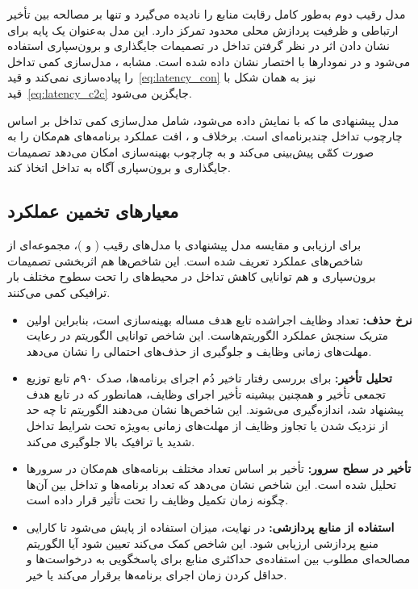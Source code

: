 مدل رقیب دوم به‌طور کامل رقابت منابع را نادیده می‌گیرد و تنها بر مصالحه بین تأخیر ارتباطی و ظرفیت پردازش محلی محدود تمرکز دارد. این مدل به‌عنوان یک پایه برای نشان دادن اثر در نظر گرفتن تداخل در تصمیمات جایگذاری و برون‌سپاری استفاده می‌شود و در نمودارها با اختصار  نشان داده شده است. مشابه ،  مدل‌سازی کمی تداخل را پیاده‌سازی نمی‌کند و قید~\eqref{eq:latency_con} نیز به همان شکل با قید~\eqref{eq:latency_c2c} جایگزین می‌شود.

مدل پیشنهادی ما که با  نمایش داده می‌شود، شامل مدل‌سازی کمی تداخل بر اساس چارچوب تداخل چندبرنامه‌ای است. برخلاف  و ،  افت عملکرد برنامه‌های هم‌مکان را به صورت کمّی پیش‌بینی می‌کند و به چارچوب بهینه‌سازی امکان می‌دهد تصمیمات جایگذاری و برون‌سپاری آگاه به تداخل اتخاذ کند.

\subsection{معیارهای تخمین عملکرد}

برای ارزیابی و مقایسه مدل پیشنهادی  با مدل‌های رقیب ( و )، مجموعه‌ای از شاخص‌های عملکرد تعریف شده است. این شاخص‌ها هم اثربخشی تصمیمات برون‌سپاری و هم توانایی کاهش تداخل در محیط‌های  را تحت سطوح مختلف بار ترافیکی کمی می‌کنند.

\begin{itemize}
\item
\textbf{نرخ حذف:} تعداد وظایف اجراشده تابع هدف مساله بهینه‌سازی است، بنابراین اولین متریک سنجش عملکرد الگوریتم‌هاست. این شاخص‌ توانایی الگوریتم در رعایت مهلت‌های زمانی وظایف و جلوگیری از حذف‌های احتمالی را نشان می‌دهد.
\item
\textbf{تحلیل تأخیر:} برای بررسی رفتار تاخیر دُم اجرای برنامه‌ها، صدک ۹۰م تابع توزیع تجمعی تأخیر و همچنین بیشینه تأخیر اجرای وظایف، همانطور که در تابع هدف پیشنهاد شد، اندازه‌گیری می‌شوند. این شاخص‌ها نشان می‌دهند الگوریتم تا چه حد از نزدیک شدن یا تجاوز وظایف از مهلت‌های زمانی به‌ویژه تحت شرایط تداخل شدید یا ترافیک بالا جلوگیری می‌کند.
\item
\textbf{تأخیر در سطح سرور:} تأخیر بر اساس تعداد مختلف برنامه‌های هم‌مکان در سرورها تحلیل شده است. این شاخص نشان می‌دهد که تعداد برنامه‌ها و تداخل بین آن‌ها چگونه زمان تکمیل وظایف را تحت تأثیر قرار داده است.
\item
\textbf{استفاده از منابع پردازشی:} در نهایت، میزان استفاده از  پایش می‌شود تا کارایی منبع پردازشی ارزیابی شود. این شاخص کمک می‌کند تعیین شود آیا الگوریتم مصالحه‌ای مطلوب بین استفاده‌ی حداکثری منابع برای پاسخگویی به درخواست‌ها و حداقل کردن زمان اجرای برنامه‌ها برقرار می‌کند یا خیر. 
\end{itemize}

